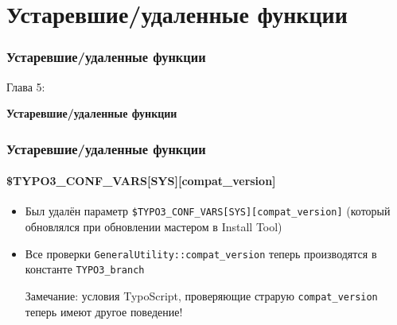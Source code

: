 %

\section{Устаревшие/удаленные функции}
\begin{frame}[fragile]
	\frametitle{Устаревшие/удаленные функции}

	\begin{center}\huge{Глава 5:}\end{center}
	\begin{center}\huge{\color{typo3darkgrey}\textbf{Устаревшие/удаленные функции}}\end{center}

\end{frame}


\begin{frame}[fragile]
	\frametitle{Устаревшие/удаленные функции}
	\framesubtitle{\$TYPO3\_CONF\_VARS[SYS][compat\_version]}

	\begin{itemize}

		\item Был удалён параметр \texttt{\$TYPO3\_CONF\_VARS[SYS][compat\_version]} (который обновлялся при
			обновлении мастером в Install Tool)

		\item Все проверки \texttt{GeneralUtility::compat\_version} теперь производятся в
			константе \texttt{TYPO3\_branch}

			\vspace{0.2cm}

			\begingroup
				\color{red}
					Замечание: условия TypoScript, проверяющие страрую \texttt{compat\_version}
					теперь имеют другое поведение!
			\endgroup

	\end{itemize}

\end{frame}

